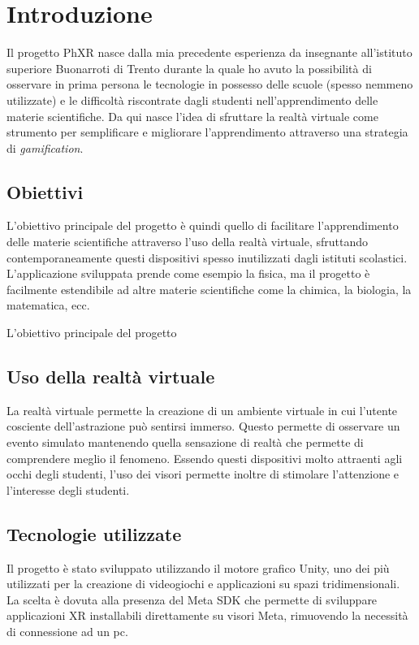\chapter{Introduzione}
\label{cha:introduzione}

Il progetto PhXR nasce dalla mia precedente esperienza da insegnante all'istituto
superiore Buonarroti di Trento durante la quale ho avuto la possibilità di
osservare in prima persona le tecnologie in possesso delle scuole (spesso nemmeno
utilizzate) e le difficoltà riscontrate dagli studenti nell'apprendimento delle
materie scientifiche. Da qui nasce l'idea di sfruttare la realtà virtuale come strumento
per semplificare e migliorare l'apprendimento attraverso una strategia di \textit{gamification}.

\section{Obiettivi}
\label{sec:introduzione_obiettivi}

L'obiettivo principale del progetto è quindi quello di facilitare l'apprendimento
delle materie scientifiche attraverso l'uso della realtà virtuale, sfruttando
contemporaneamente questi dispositivi spesso inutilizzati dagli istituti
scolastici. L'applicazione sviluppata prende come esempio la fisica, ma il
progetto è facilmente estendibile ad altre materie scientifiche come la chimica,
la biologia, la matematica, ecc.

L'obiettivo principale del progetto

\section{Uso della realtà virtuale}
\label{sec:introduzione_uso_realtà_virtuale}

La realtà virtuale permette la creazione di un ambiente virtuale in cui l'utente
cosciente dell'astrazione può sentirsi immerso. Questo permette di osservare un
evento simulato mantenendo quella sensazione di realtà che permette di
comprendere meglio il fenomeno. Essendo questi dispositivi molto attraenti agli occhi
degli studenti, l'uso dei visori permette inoltre di stimolare l'attenzione e l'interesse
degli studenti.

\section{Tecnologie utilizzate}
\label{sec:introduzione_tecnologie_utilizzate}

Il progetto è stato sviluppato utilizzando il motore grafico Unity, uno dei più
utilizzati per la creazione di videogiochi e applicazioni su spazi
tridimensionali. La scelta è dovuta alla presenza del Meta SDK che permette di sviluppare
applicazioni XR installabili direttamente su visori Meta, rimuovendo la
necessità di connessione ad un pc.